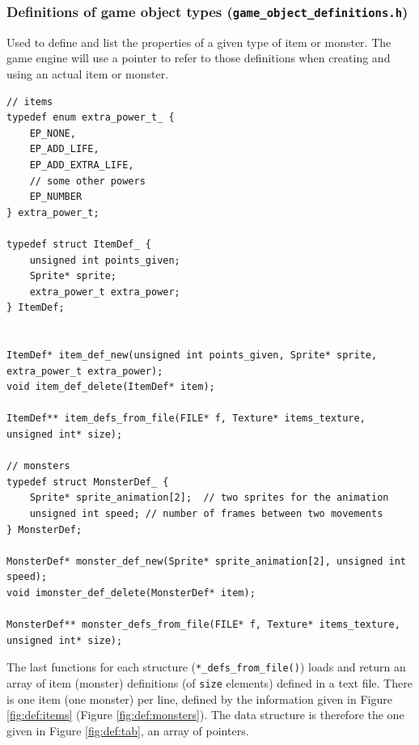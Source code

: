 \documentclass[12pt,a4paper]{article}
\begin{document}
\subsubsection{Definitions of game object types (\texttt{game\_object\_definitions.h})}

Used to define and list the properties of a given type of item or monster. The game engine will use a pointer to refer to those definitions when creating and using an actual item or monster.

\begin{verbatim}
// items
typedef enum extra_power_t_ {
	EP_NONE,
	EP_ADD_LIFE,
	EP_ADD_EXTRA_LIFE,
	// some other powers
	EP_NUMBER
} extra_power_t;

typedef struct ItemDef_ {
	unsigned int points_given;
	Sprite* sprite;
	extra_power_t extra_power;
} ItemDef;


ItemDef* item_def_new(unsigned int points_given, Sprite* sprite, extra_power_t extra_power);
void item_def_delete(ItemDef* item);

ItemDef** item_defs_from_file(FILE* f, Texture* items_texture, unsigned int* size);

// monsters
typedef struct MonsterDef_ {
	Sprite* sprite_animation[2];  // two sprites for the animation
	unsigned int speed; // number of frames between two movements
} MonsterDef;

MonsterDef* monster_def_new(Sprite* sprite_animation[2], unsigned int speed);
void imonster_def_delete(MonsterDef* item);

MonsterDef** monster_defs_from_file(FILE* f, Texture* items_texture, unsigned int* size);
\end{verbatim}


The last functions for each structure (\texttt{*_defs_from_file()}) loads and return an array of item (monster) definitions (of \texttt{size} elements) defined in a text file. There is one item (one monster) per line, defined by the information given in Figure \ref{fig:def:items} (Figure \ref{fig:def:monsters}). The data structure is therefore the one given in Figure \ref{fig:def:tab}, an array of pointers.
\end{document}
